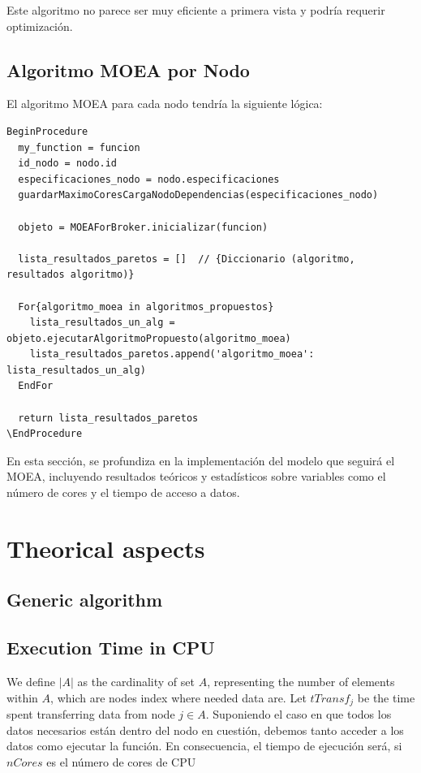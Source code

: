 \documentclass{article}
\begin{document}
Este algoritmo no parece ser muy eficiente a primera vista y podría requerir optimización.

\subsection{Algoritmo MOEA por Nodo}

El algoritmo MOEA para cada nodo tendría la siguiente lógica:

\begin{verbatim}
BeginProcedure
  my_function = funcion
  id_nodo = nodo.id
  especificaciones_nodo = nodo.especificaciones
  guardarMaximoCoresCargaNodoDependencias(especificaciones_nodo)
  
  objeto = MOEAForBroker.inicializar(funcion)
  
  lista_resultados_paretos = []  // {Diccionario (algoritmo, resultados algoritmo)}
  
  For{algoritmo_moea in algoritmos_propuestos}
    lista_resultados_un_alg =  objeto.ejecutarAlgoritmoPropuesto(algoritmo_moea)
    lista_resultados_paretos.append('algoritmo_moea': lista_resultados_un_alg)
  EndFor
  
  return lista_resultados_paretos
\EndProcedure
\end{verbatim}

En esta sección, se profundiza en la implementación del modelo que seguirá el MOEA, incluyendo resultados teóricos y estadísticos sobre variables como el número de cores y el tiempo de acceso a datos.

\section{Theorical aspects}

\subsection{Generic algorithm}

\subsection{Execution Time in CPU}

We define $|A|$ as the cardinality of set $A$, representing the number of elements within $A$, which are nodes index where needed data are. Let $tTransf_j$ be the time spent transferring data from node $j \in A$. Suponiendo el caso en que todos los datos necesarios están dentro del nodo en cuestión, debemos tanto acceder a los datos como ejecutar la función. En consecuencia, el tiempo de ejecución será, si \(nCores\) es el número de cores de CPU
\end{document}
